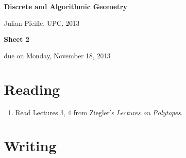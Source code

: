 \documentclass[11pt]{amsart}
\begin{document}
\begin{center}
\textbf{\sffamily
   Discrete and Algorithmic Geometry }

\medskip
   Julian Pfeifle,
   UPC, 2013 \mbox{}
\end{center}

\bigskip

\begin{center}
  \textbf{\sffamily Sheet 2}

\bigskip
 due on Monday, November 18, 2013

\end{center}

\bigskip
\enlargethispage{2cm}
\section*{Reading}

\begin{enumerate}
\setlength{\itemsep}{2ex}
\item Read Lectures 3, 4 from Ziegler's \emph{Lectures on Polytopes}.

\end{enumerate}

\section*{Writing}
\end{document}
